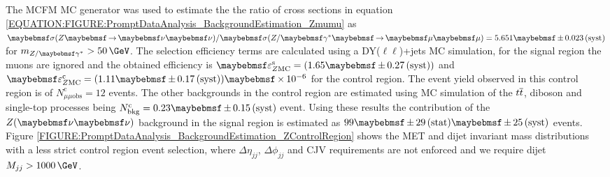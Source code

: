 The \textsc{MCFM} \gls{MC} generator \cite{ARTICLE:MCFMGenerator} was used to estimate the the ratio of cross sections in equation \ref{EQUATION:FIGURE:PromptDataAnalysis_BackgroundEstimation_Zmumu} as $\sigma(\Z \to \nu \nu) / \sigma(\Z/\gamma^{*} \to \mu \mu) = 5.651 \pm 0.023\syst$ for $m_{\Z/\gamma^{*}} > 50\,\GeV$. The selection efficiency terms are calculated using a DY($\ell\ell$)+jets \gls{MC} simulation, for the signal region the muons are ignored and the obtained efficiency is $\varepsilon^\mathrm{s}_{\Z \mathrm{MC}} = (1.65 \pm 0.27\syst)$ and $\varepsilon^\mathrm{c}_{\Z \mathrm{MC}}=(1.11 \pm 0.17\syst) \times 10^{-6}$ for the control region. The event yield observed in this control region is of $N^\mathrm{c}_{\mu\mu\text{obs}} = 12$ events. The other backgrounds in the control region are estimated using \gls{MC} simulation of the $t\overline{t}$, diboson and single-top processes being $N^\mathrm{c}_\text{bkg}=0.23 \pm 0.15\syst$ event. Using  these results the contribution of the  $\Z (\nu \nu)$ background in the signal region is estimated as $99 \pm 29\stat \pm 25\syst$ events. Figure \ref{FIGURE:PromptDataAnalysis_BackgroundEstimation_ZControlRegion} shows the \gls{MET} and dijet invariant mass distributions with a less strict \Z control region event selection, where $\Delta\eta_{jj}$, $\Delta\phi_{jj}$ and \gls{CJV} requirements are not enforced and we require dijet $M_{jj}>1000\,\GeV$. 

